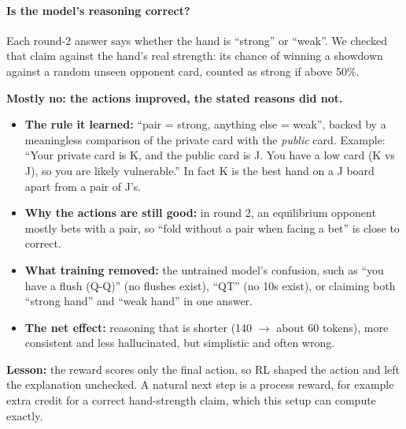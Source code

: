 \documentclass[10.5pt]{article}
\begin{document}
\paragraph{Is the model's reasoning correct?} Each round-2 answer says whether the hand is ``strong'' or ``weak''. We
checked that claim against the hand's real strength: its chance of winning a showdown against a random unseen opponent
card, counted as strong if above 50\%.
\begin{table}[H]
\centering\small
{}
\caption{Correctness of the stated reasoning (round-2 answers containing a strength claim).}
\label{tab:reason}
\end{table}
\textbf{Mostly no: the actions improved, the stated reasons did not.}
\begin{itemize}
\item \textbf{The rule it learned:} ``pair = strong, anything else = weak'', backed by a meaningless comparison of the
  private card with the \emph{public} card. Example: ``Your private card is K, and the public card is J. You have a low
  card (K vs J), so you are likely vulnerable.'' In fact K is the best hand on a J board apart from a pair of J's.
\item \textbf{Why the actions are still good:} in round 2, an equilibrium opponent mostly bets with a pair, so ``fold
  without a pair when facing a bet'' is close to correct.
\item \textbf{What training removed:} the untrained model's confusion, such as ``you have a flush (Q-Q)'' (no flushes
  exist), ``QT'' (no 10s exist), or claiming both ``strong hand'' and ``weak hand'' in one answer.
\item \textbf{The net effect:} reasoning that is shorter (140 $\to$ about 60 tokens), more consistent and less
  hallucinated, but simplistic and often wrong.
\end{itemize}
\textbf{Lesson:} the reward scores only the final action, so RL shaped the action and left the explanation unchecked. A
natural next step is a process reward, for example extra credit for a correct hand-strength claim, which this setup can
compute exactly.
\end{document}
